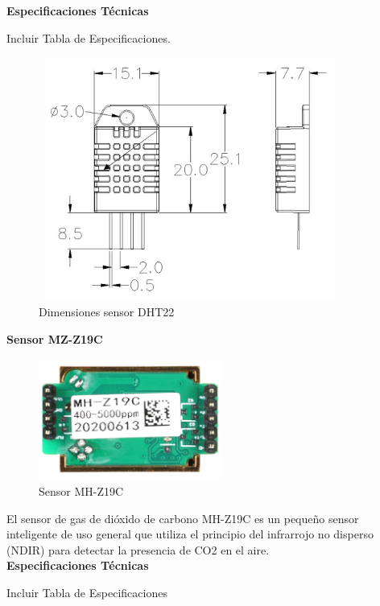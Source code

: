 \textbf{Especificaciones Técnicas}

Incluir Tabla de Especificaciones.\\

\begin{figure}[h]
    \centering
    \includegraphics[width=10cm, height=8cm]{imagenes/dht22 dimensiones.jpg}
    \caption{Dimensiones sensor DHT22}
    \label{imag:dimensiones_dht22}
\end{figure}


\textbf{Sensor MZ-Z19C} %

\begin{figure}[h]
      \centering
      \includegraphics[width=6cm, height=4cm]{imagenes/mh-z19c.png}
      \caption{Sensor MH-Z19C}
      \label{imag:mh-z19c}
   \end{figure}

El sensor de gas de dióxido de carbono MH-Z19C es un pequeño sensor inteligente de uso general que utiliza el principio del infrarrojo no disperso (NDIR) para detectar la presencia de CO2 en el aire.\\

\textbf{Especificaciones Técnicas}

Incluir Tabla de Especificaciones\\\\

